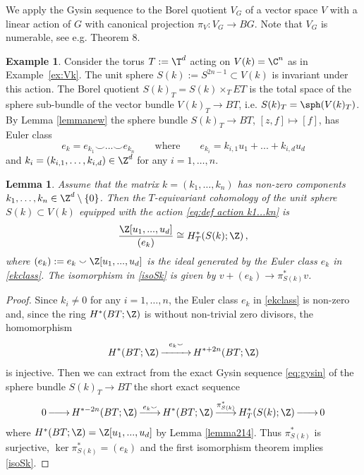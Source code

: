 \documentclass[11pt,a4paper,reqno]{article}
\DeclareMathOperator*{\ttoup}{\llongrightarrow}
\DeclareMathOperator*{\tttoup}{\xrightarrow{\hspace*{25pt}}}
\DeclareRobustCommand{\llongrightarrow}{\relbar\joinrel\relbar\joinrel\rightarrow}
\numberwithin{equation}{section}
\newtheorem{lemma}[theorem]{Lemma}
\theoremstyle{definition}
\newtheorem{example}[theorem]{Example}
\begin{document}
We apply the Gysin sequence to the  Borel quotient  $ V_G $ 
of a
vector space $ V $ with a linear action of $G$ with canonical projection $\pi_V : V_G \to BG $. Note that $ V_G $ is numerable, see  e.g. \cite{Dold} Theorem 8.

\begin{example}\label{ex:S(k)}
Consider the torus $T:=\T^d$ acting on $V(k)=\C^n$ as  in Example~\ref{ex:Vk}.
The unit sphere 
$ 
 S(k):=S^{2n-1}\subset V(k) $
is invariant under this action. The Borel quotient $S(k)_T=S(k)\times_T ET$ is the total space of the sphere sub-bundle of the vector bundle $V(k)_T\to BT$, i.e.
$  S(k)_T = \sph(V(k)_T) $. 
By Lemma 
\ref{lemmanew}
the sphere bundle $S(k)_T\to BT$, $[z,f]\mapsto [f]$,  has Euler class 
\begin{equation}\label{ekclass}
e_k=e_{k_1}\smallsmile...\smallsmile e_{k_n} \qquad \text{where} \qquad  
e_{k_i} = 
k_{i,1}u_1+...+k_{i,d}u_d  
\end{equation}
and 
$ k_i = (k_{i,1}, \ldots, k_{i,d}) \in \Z^d $ for any $ i =1, \ldots, n $. 

\begin{lemma}\label{p:cohomology_sphere}
Assume that the %
matrix $k = (k_1, \ldots, k_n ) $  has non-zero components $ k_1, \ldots, k_n \in \Z^d \setminus \{ 0 \} $. Then the $T$-equivariant cohomology of the unit sphere $S(k) \subset V(k)$ equipped with the action \eqref{eq:def action k1...kn} is  
\begin{equation}\label{isoSk}
 \frac{\Z[u_1,...,u_d]}{(e_k)}\cong H^*_T(S(k);\Z) \, ,
\end{equation}
where $(e_k):=e_k\smallsmile \Z[u_1,...,u_d]$ is the ideal generated by the Euler class 
$e_k$ in \eqref{ekclass}. The isomorphism in \eqref{isoSk} is given by $v+(e_k)\to \pi^*_{S(k)} v$. 
\end{lemma}

\begin{proof}
Since $ k_i \neq 0 $ for any $ i = 1, \ldots, n $, the Euler class $e_k$ in 
\eqref{ekclass} is non-zero and, since 
the ring $ H^{*}(BT;\Z) $ is without  
non-trivial zero divisors,  the homomorphism 
\[H^*(BT;\Z)\tttoup^{e_k\smallsmile} H^{*+2n}(BT;\Z) \]
is injective. Then we can extract from the exact Gysin sequence 
\eqref{eq:gysin} of the sphere bundle $S(k)_T\to BT$ the short exact sequence
\begin{align*}
0\ttoup H^{*-2n}(BT;\Z) \ttoup^{e_k\smallsmile}   
H^{*}(BT;\Z) \ttoup^{\pi_{S(k)}^*}   H^*_T(S(k);\Z) \ttoup 0  
\end{align*}
where $H^*(BT;\Z)=\Z[u_1,...,u_d]$ by Lemma \ref{lemma214}.
Thus 
$\pi_{S(k)}^*$
is surjective, 
$ \ker \pi_{S(k)}^* =
(e_k) $  
and  the first isomorphism theorem 
implies   \eqref{isoSk}.
\end{proof}
\end{example}
\end{document}
